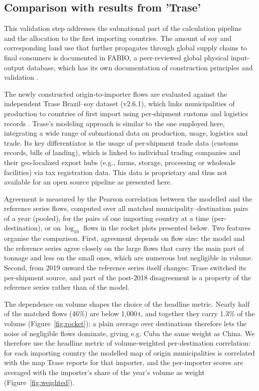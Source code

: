 \documentclass[pdflatex,sn-nature]{sn-jnl}%
\begin{document}
\subsection{Comparison with results from 'Trase'}\label{subsec:val-trase}
This validation step addresses the subnational part of the calculation pipeline and the allocation to the first importing countries. The amount of soy and corresponding land use that further propagates through global supply chains to final consumers is documented in FABIO, a peer-reviewed global physical input-output database, which has its own documentation of construction principles and validation \cite{bruckner2019fabio}.

The newly constructed origin-to-importer flows are evaluated against the
independent Trase Brazil--soy dataset (v2.6.1), which links
municipalities of production to countries of first import using
per-shipment customs and logistics records
\cite{godar2015sei,escobar2020trase}. Trase’s modeling approach is similar to the one employed here, integrating a wide range of subnational data on production, usage, logistics and trade. Its key differentiator is the usage of per-shipment trade data (customs records, bills of landing), which is linked to individual trading companies and their geo-localized export hubs (e.g., farms, storage, processing or wholesale facilities) via tax registration data. This data is proprietary and thus not available for an open source pipeline as presented here.

Agreement is measured by the
Pearson correlation between the modelled and the reference series flows, computed over all matched municipality--destination pairs of a year (pooled), for the pairs of one importing country at a time (per-destination), or on $\log_{10}$ flows in the rocket plots presented below. Two features organise the comparison. First, agreement depends on flow size: the model and the reference series agree closely on the large flows that carry the main part of tonnage and less on the small ones, which are numerous but negligible in volume. Second, from 2019 onward the reference series itself changes: Trase switched its per-shipment source, and part of the post-2018 disagreement is a property of the reference series rather than of the model.

The dependence on volume shapes the choice of the headline metric. Nearly half of the matched flows (46\%) are below 1{,}000\,t, and together they carry 1.3\% of the volume (Figure~\ref{fig:rocket}); a plain average over destinations therefore lets the noise of negligible flows dominate, giving e.g. Cuba the same weight as China. We therefore use the headline metric of volume-weighted per-destination correlation: for each importing country the modelled map of origin municipalities is correlated with the map Trase reports for that importer, and the per-importer scores are averaged with the importer's share of the year's volume as weight (Figure~\ref{fig:weighted}).
\end{document}
